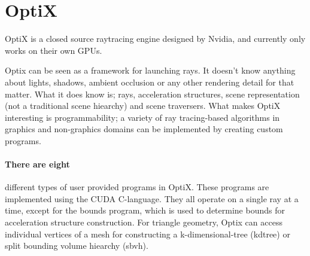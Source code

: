 \section{OptiX}

OptiX is a closed source raytracing engine designed by Nvidia, and currently only works on their own GPUs.

Optix can be seen as a framework for launching rays. It doesn't know anything about lights, shadows, ambient occlusion or any other rendering detail for that matter. What it does know is; rays, acceleration structures, scene representation (not a traditional scene hiearchy) and scene traversers. What makes OptiX interesting is programmability; a variety of ray tracing-based algorithms in graphics and non-graphics domains can be implemented \cite{Parker10OptiX} by creating custom programs.

\paragraph{There are eight} different types of user provided programs in OptiX. These programs are implemented using the CUDA C-language. They all operate on a single ray at a time, except for the bounds program, which is used to determine bounds for acceleration structure construction. For triangle geometry, Optix can access individual vertices of a mesh for constructing a k-dimensional-tree (kdtree) or split bounding volume hiearchy (sbvh).

